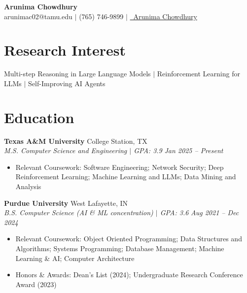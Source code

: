 \documentclass[10pt,letterpaper]{article}
\newcommand{\heading}[4]{%
  \noindent\textbf{#1} \hfill #2\\
  \textit{#3} \hfill \textit{#4}\par
}
\begin{document}

\begin{center}
  {\Large \textbf{Arunima Chowdhury}}\\[2pt]
  arunimac02@tamu.edu $|$ (765) 746-9899 $|$
  \href{https://linkedin.com/in/arunima-chowdhury}{\faLinkedin\ Arunima Chowdhury}
\end{center}
\vspace{-8pt}


\section{Research Interest}
Multi-step Reasoning in Large Language Models $|$ Reinforcement Learning for LLMs $|$ Self-Improving AI Agents

\section{Education}

\heading{Texas A\&M University}{College Station, TX}{M.S. Computer Science and Engineering $|$ GPA: 3.9}{Jan 2025 -- Present}
\begin{itemize}
  \item Relevant Coursework: Software Engineering; Network Security; Deep Reinforcement Learning; Machine Learning and LLMs; Data Mining and Analysis
\end{itemize}

\heading{Purdue University}{West Lafayette, IN}{B.S. Computer Science (AI \& ML concentration) $|$ GPA: 3.6}{Aug 2021 -- Dec 2024}
\begin{itemize}
  \item Relevant Coursework: Object Oriented Programming; Data Structures and Algorithms; Systems Programming; Database Management; Machine Learning \& AI; Computer Architecture
  \item Honors \& Awards: Dean's List (2024); Undergraduate Research Conference Award (2023)
\end{itemize}
\end{document}
